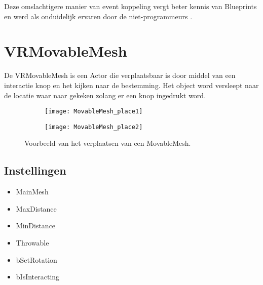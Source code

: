 Deze omslachtigere manier van event koppeling vergt beter kennis van Blueprints en werd als onduidelijk ervaren door de niet-programmeurs . 

\section{VRMovableMesh}
De VRMovableMesh is een Actor die verplaatsbaar is door middel van een interactie knop en het kijken naar de bestemming. Het object word versleept naar de locatie waar naar gekeken zolang er een knop ingedrukt word.

\begin{figure}[!ht]
  \centering
  	\begin{subfigure}[b]{\linewidth/3}
    	\texttt{[image: MovableMesh\_place1]}
    	\label{fig:a}
	\end{subfigure}

	\begin{subfigure}[b]{\linewidth/3}
    	\texttt{[image: MovableMesh\_place2]}
    	\label{fig:b}
	\end{subfigure}

	\caption{Voorbeeld van het verplaatsen van een MovableMesh.}
\end{figure}

\subsection{Instellingen}

\begin{itemize}
	\item MainMesh
	\item MaxDistance
	\item MinDistance
	\item Throwable
	\item bSetRotation
	\item bIsInteracting
\end{itemize}